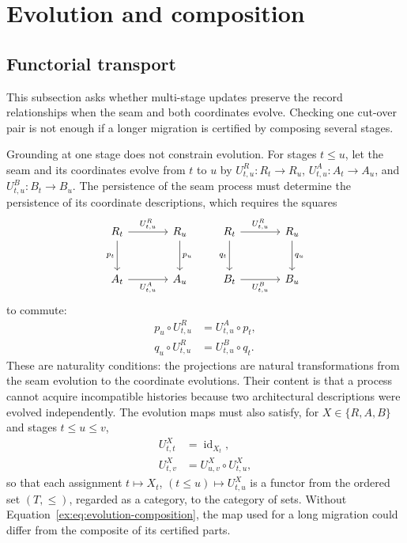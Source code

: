 \documentclass[smallextended,envcountsect,envcountsame,natbib]{svjour3}
\begin{document}
\section{Evolution and composition}\label{ex:sec:evolution}

\subsection{Functorial transport}\label{ex:sec:functorial-transport}

This subsection asks whether multi-stage updates preserve the record relationships when the seam and both coordinates evolve. Checking one cut-over pair is not enough if a longer migration is certified by composing several stages.

Grounding at one stage does not constrain evolution. For stages $t\leq u$, let the seam and its coordinates evolve from $t$ to $u$ by
$U^{R}_{t,u}:R_t\to R_u$, $U^{A}_{t,u}:A_t\to A_u$, and $U^{B}_{t,u}:B_t\to B_u$. The persistence of the seam process must determine the persistence of its coordinate descriptions, which requires the squares
\begin{equation}\label{ex:eq:dynamic-squares}
\begin{tikzcd}[column sep=large,row sep=large,baseline=(current bounding box.center)]
R_t \arrow[r,"U^{R}_{t,u}"] \arrow[d,"p_t"']
  & R_u \arrow[d,"p_u"] \\
A_t \arrow[r,"U^{A}_{t,u}"'] & A_u
\end{tikzcd}
\qquad
\begin{tikzcd}[column sep=large,row sep=large,baseline=(current bounding box.center)]
R_t \arrow[r,"U^{R}_{t,u}"] \arrow[d,"q_t"']
  & R_u \arrow[d,"q_u"] \\
B_t \arrow[r,"U^{B}_{t,u}"'] & B_u
\end{tikzcd}
\end{equation}
to commute:
\begin{align}
p_{u}\circ U^R_{t,u} &=U^A_{t,u}\circ p_{t},\label{ex:eq:back-naturality}\\
q_{u}\circ U^R_{t,u} &=U^B_{t,u}\circ q_{t}. \label{ex:eq:fwd-naturality}
\end{align}
These are naturality conditions: the projections are natural transformations from the seam evolution to the coordinate evolutions. Their content is that a process cannot acquire incompatible histories because two architectural descriptions were evolved independently. The evolution maps must also satisfy, for $X \in \{R,A,B\}$ and stages $t\leq u\leq v$,
\begin{align}
U^{X}_{t,t} &=\operatorname{id}_{X_t},\label{ex:eq:evolution-identity}\\
U^{X}_{t,v} &=U^{X}_{u,v}\circ U^{X}_{t,u},\label{ex:eq:evolution-composition}
\end{align}
so that each assignment $t \mapsto X_t$, $(t\leq u)\mapsto U^X_{t,u}$ is a functor from the ordered set $(T,\leq)$, regarded as a category, to the category of sets. Without Equation~\eqref{ex:eq:evolution-composition}, the map used for a long migration could differ from the composite of its certified parts.
\end{document}
